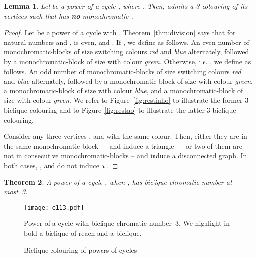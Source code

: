 \documentclass{article}
\newtheorem{theorem}{Theorem}
\newtheorem{lemma}[theorem]{Lemma}
\begin{document}
\begin{lemma}
\label{lem:3colouringnomonoP3}
Let  be a power of a cycle , where . Then,  admits a
3-colouring of its vertices such that  has \textbf{no} monochromatic .
\end{lemma}
\begin{proof}
Let  be a power of a cycle  with . 
Theorem~\ref{thm:division} says that 
for natural numbers  and ,  is even, and . If , we define  as follows. An even number
 of monochromatic-blocks of size  switching colours \emph{red} and
\emph{blue} alternately, followed by a monochromatic-block of size  with
colour \emph{green}. Otherwise, i.e. , we define
 as follows. An odd number  of
monochromatic-blocks of size  switching colours \emph{red} and \emph{blue}
alternately, followed by a monochromatic-block of size  with colour
\emph{green}, a monochromatic-block of size  with colour \emph{blue}, and a
monochromatic-block of size  with colour \emph{green}.  We refer to
Figure~\ref{fig:restinho} to illustrate the former 3-biclique-colouring and to
Figure~\ref{fig:restao} to illustrate the latter 3-biclique-colouring.

Consider any three vertices ,  and  with the
same colour. Then, either they are in the same monochromatic-block --- and
induce a triangle --- or two of them are not in consecutive
monochromatic-blocks -- and induce a disconnected graph. In both cases, ,
 and  do not induce a . 
\end{proof}

\begin{theorem}
\label{thm:bicliqueupperboundpowerofcycle}
A power of a cycle , when ,
has biclique-chromatic number at most~3.
\end{theorem}


\begin{figure}[t]
\centering
	\texttt{[image: c113.pdf]}
	\caption{Power of a cycle  with biclique-chromatic number~3.
	We highlight in bold a  biclique of reach  and a  biclique.}
	\label{fig:c113}
\end{figure}

\begin{figure}[t]
\centering
	\qquad
	\qquad
	\qquad
	\caption{Biclique-colouring of
	powers of cycles}
	\label{fig:2nd3bicliquecolouring}
\end{figure}
\end{document}
